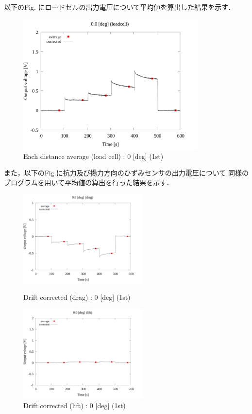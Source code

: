 以下のFig. にロードセルの出力電圧について平均値を算出した結果を示す．

\begin{figure}[htbp]
	\footnotesize
	\begin{center}
		\includegraphics[width=95mm]{../../02_workspace/result/2-1/plot/03-1_loadcell/03_loadcell_average_0.png}
		\caption{Each distance average (load cell) : 0 [deg] (1st)}
	\end{center}
\end{figure}

また，以下のFig.に抗力及び揚力方向のひずみセンサの出力電圧について
同様のプログラムを用いて平均値の算出を行った結果を示す．

\begin{figure}[htbp]
	\begin{minipage}[b]{0.45\linewidth}
		\centering
		\includegraphics[width=65mm]{../../02_workspace/result/2-1/plot/03-2_drag/03_drag_average_0.png}
		\caption{Drift corrected (drag) : 0 [deg] (1st)}
	\end{minipage}
	\begin{minipage}[b]{0.45\linewidth}
		\centering
		\includegraphics[width=65mm]{../../02_workspace/result/2-1/plot/03-3_lift/03_lift_average_0.png}
		\caption{Drift corrected (lift) : 0 [deg] (1st)}
	\end{minipage}
\end{figure}


